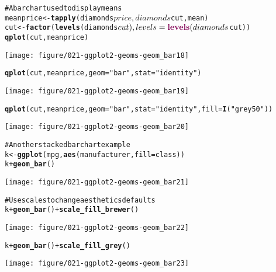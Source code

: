 \documentclass[a4paper,titlepage]{tufte-handout}\usepackage{graphicx, color}
\makeatletter
\def\maxwidth{ %
  \ifdim\Gin@nat@width>\linewidth
    \linewidth
  \else
    \Gin@nat@width
  \fi
}
\newcommand{\hlfunctioncall}[1]{\textcolor[rgb]{0.501960784313725,0,0.329411764705882}{\textbf{#1}}}%
\newcommand{\hlstring}[1]{\textcolor[rgb]{0.6,0.6,1}{#1}}%
\newcommand{\hlcomment}[1]{\textcolor[rgb]{0.180392156862745,0.6,0.341176470588235}{#1}}%
\newenvironment{kframe}{%
 \def\at@end@of@kframe{}%
 \ifinner\ifhmode%
  \def\at@end@of@kframe{\end{minipage}}%
  \begin{minipage}{\columnwidth}%
 \fi\fi%
 \def\FrameCommand##1{\hskip\@totalleftmargin \hskip-\fboxsep
 \colorbox{shadecolor}{##1}\hskip-\fboxsep
     \hskip-\linewidth \hskip-\@totalleftmargin \hskip\columnwidth}%
 \MakeFramed {\advance\hsize-\width
   \@totalleftmargin\z@ \linewidth\hsize
   \@setminipage}}%
 {\par\unskip\endMakeFramed%
 \at@end@of@kframe}
\newenvironment{knitrout}{}{} %
\makeatother
\begin{document}
\begin{knitrout}
\begin{kframe}
\begin{alltt}
\hlcomment{# A bar chart used to display means}
meanprice <- \hlfunctioncall{tapply}(diamonds$price, diamonds$cut, mean)
cut <- \hlfunctioncall{factor}(\hlfunctioncall{levels}(diamonds$cut), levels = \hlfunctioncall{levels}(diamonds$cut))
\hlfunctioncall{qplot}(cut, meanprice)
\end{alltt}
\end{kframe}
\texttt{[image: figure/021-ggplot2-geoms-geom\_bar18]} 
\begin{kframe}\begin{alltt}
\hlfunctioncall{qplot}(cut, meanprice, geom=\hlstring{"bar"}, stat=\hlstring{"identity"})
\end{alltt}
\end{kframe}
\texttt{[image: figure/021-ggplot2-geoms-geom\_bar19]} 
\begin{kframe}\begin{alltt}
\hlfunctioncall{qplot}(cut, meanprice, geom=\hlstring{"bar"}, stat=\hlstring{"identity"}, fill = \hlfunctioncall{I}(\hlstring{"grey50"}))
\end{alltt}
\end{kframe}
\texttt{[image: figure/021-ggplot2-geoms-geom\_bar20]} 
\begin{kframe}\begin{alltt}

\hlcomment{# Another stacked bar chart example}
k <- \hlfunctioncall{ggplot}(mpg, \hlfunctioncall{aes}(manufacturer, fill=class))
k + \hlfunctioncall{geom_bar}()
\end{alltt}
\end{kframe}
\texttt{[image: figure/021-ggplot2-geoms-geom\_bar21]} 
\begin{kframe}\begin{alltt}
\hlcomment{# Use scales to change aesthetics defaults}
k + \hlfunctioncall{geom_bar}() + \hlfunctioncall{scale_fill_brewer}()
\end{alltt}
\end{kframe}
\texttt{[image: figure/021-ggplot2-geoms-geom\_bar22]} 
\begin{kframe}\begin{alltt}
k + \hlfunctioncall{geom_bar}() + \hlfunctioncall{scale_fill_grey}()
\end{alltt}
\end{kframe}
\texttt{[image: figure/021-ggplot2-geoms-geom\_bar23]} 
\begin{kframe}\begin{alltt}


\end{alltt}
\end{kframe}
\end{knitrout}
\end{document}
